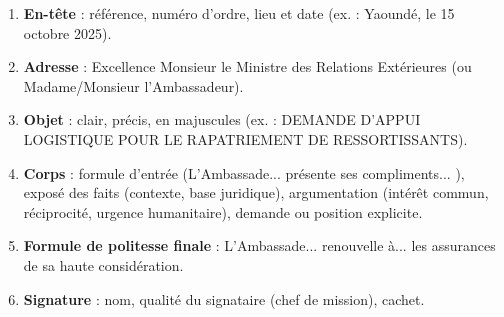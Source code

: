 \documentclass[11pt]{article}
\begin{document}
\begin{methode}
\begin{enumerate}
  \item \textbf{En-tête} : référence, numéro d'ordre, lieu et date (ex. : Yaoundé, le 15 octobre 2025).
  \item \textbf{Adresse} : \og Excellence Monsieur le Ministre des Relations Extérieures \fg{} (ou Madame/Monsieur l'Ambassadeur).
  \item \textbf{Objet} : clair, précis, en majuscules (ex. : DEMANDE D'APPUI LOGISTIQUE POUR LE RAPATRIEMENT DE RESSORTISSANTS).
  \item \textbf{Corps} : formule d'entrée (\og L'Ambassade... présente ses compliments... \fg), exposé des faits (contexte, base juridique), argumentation (intérêt commun, réciprocité, urgence humanitaire), demande ou position explicite.
  \item \textbf{Formule de politesse finale} : \og L'Ambassade... renouvelle à... les assurances de sa haute considération. \fg
  \item \textbf{Signature} : nom, qualité du signataire (chef de mission), cachet.
\end{enumerate}
\end{methode}
\end{document}

